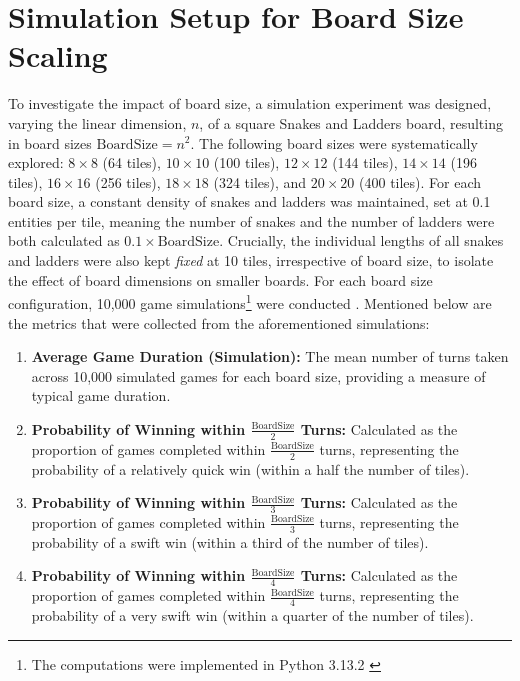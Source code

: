 \section{Simulation Setup for Board Size Scaling}

To investigate the impact of board size, a simulation experiment was designed, varying the linear dimension, $n$, of a square Snakes and Ladders board, resulting in board sizes $\text{BoardSize} = n^2$. The following board sizes were systematically explored: $8 \times 8$ (64 tiles), $10 \times 10$ (100 tiles), $12 \times 12$ (144 tiles), $14 \times 14$ (196 tiles), $16 \times 16$ (256 tiles), $18 \times 18$ (324 tiles), and $20 \times 20$ (400 tiles).  For each board size, a constant density of snakes and ladders was maintained, set at 0.1 entities per tile, meaning the number of snakes and the number of ladders were both calculated as $0.1 \times \text{BoardSize}$.  Crucially, the individual lengths of all snakes and ladders were also kept \textit{fixed} at 10 tiles, irrespective of board size, to isolate the effect of board dimensions on smaller boards. For each board size configuration, 10,000 game simulations\footnote{The computations were implemented in Python 3.13.2 \autocite{python}} were conducted . Mentioned below are the metrics that were collected from the aforementioned simulations:

\begin{enumerate}
	\item \textbf{Average Game Duration (Simulation):}  The mean number of turns taken across 10,000 simulated games for each board size, providing a measure of typical game duration.
	\item \textbf{Probability of Winning within $\frac{\text{BoardSize}}{2}$ Turns:} Calculated as the proportion of games completed within $\frac{\text{BoardSize}}{2}$ turns, representing the probability of a relatively quick win (within a half the number of tiles).
	\item \textbf{Probability of Winning within $\frac{\text{BoardSize}}{3}$ Turns:}  Calculated as the proportion of games completed within $\frac{\text{BoardSize}}{3}$ turns, representing the probability of a swift win (within a third of the number of tiles).
	\item \textbf{Probability of Winning within $\frac{\text{BoardSize}}{4}$ Turns:}  Calculated as the proportion of games completed within $\frac{\text{BoardSize}}{4}$ turns, representing the probability of a very swift win (within a quarter of the number of tiles).
\end{enumerate}

